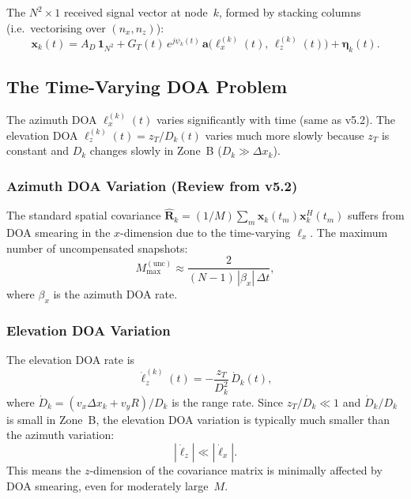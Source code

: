 \documentclass[11pt,a4paper]{article}
\begin{document}
The $N^2\times 1$ received signal vector at node~$k$, formed by
stacking columns (i.e.\ vectorising over $(n_x,n_z)$):
\begin{equation}
  \mathbf{x}_k(t) = A_D\,\mathbf{1}_{N^2}
  + G_T(t)\,e^{j\psi_k(t)}\,
  \mathbf{a}\bigl(\ell_x^{(k)}(t),\,\ell_z^{(k)}(t)\bigr)
  + \bm{\eta}_k(t).
  \label{eq:rx_vector}
\end{equation}

\subsection{The Time-Varying DOA Problem}
\label{sec:tv_doa}

The azimuth DOA $\ell_x^{(k)}(t)$ varies significantly with time
(same as v5.2).  The elevation DOA $\ell_z^{(k)}(t)=z_T/D_k(t)$
varies much more slowly because $z_T$ is constant and $D_k$ changes
slowly in Zone~B ($D_k\gg\Delta x_k$).

\subsubsection{Azimuth DOA Variation (Review from v5.2)}

The standard spatial covariance
$\hat{\mathbf{R}}_k=(1/M)\sum_m\mathbf{x}_k(t_m)\mathbf{x}_k^H(t_m)$
suffers from DOA smearing in the $x$-dimension due to the
time-varying $\ell_x$.  The maximum number of uncompensated snapshots:
\begin{equation}
  M_{\max}^{\mathrm{(unc)}} \approx
  \frac{2}{(N{-}1)\,|\beta_x|\,\Delta t},
  \label{eq:Mmax_uncomp}
\end{equation}
where $\beta_x$ is the azimuth DOA rate.

\subsubsection{Elevation DOA Variation}

The elevation DOA rate is
\begin{equation}
  \dot{\ell}_z^{(k)}(t) = -\frac{z_T}{D_k^2}\,\dot{D}_k(t),
  \label{eq:lz_rate}
\end{equation}
where $\dot{D}_k = (v_x\Delta x_k + v_y R)/D_k$ is the range rate.
Since $z_T/D_k\ll 1$ and $\dot{D}_k/D_k$ is small in Zone~B, the
elevation DOA variation is typically much smaller than the azimuth
variation:
\begin{equation}
  |\dot{\ell}_z| \ll |\dot{\ell}_x|.
  \label{eq:lz_slow}
\end{equation}
This means the $z$-dimension of the covariance matrix is minimally
affected by DOA smearing, even for moderately large~$M$.
\end{document}
